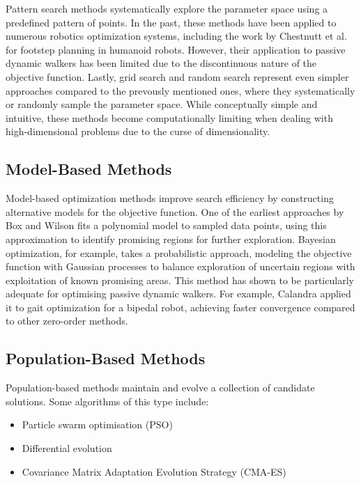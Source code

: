 Pattern search methods\cite{Hooke1961}\cite{Torczon1997} systematically explore the parameter space using a predefined pattern of points.
In the past, these methods have been applied to numerous robotics optimization systems, including the work by Chestnutt et al.\cite{Chestnutt2005} for footstep planning in humanoid robots. 
However, their application to passive dynamic walkers has been limited due to the discontinuous nature of the objective function.
Lastly, grid search and random search represent even simpler approaches compared to the prevously mentioned ones, where they systematically or randomly sample the parameter space.
While conceptually simple and intuitive, these methods become computationally limiting when dealing with high-dimensional problems due to the curse of dimensionality.

\subsection{Model-Based Methods}
Model-based optimization methods improve search efficiency by constructing alternative models for the objective function.
One of the earliest approaches by Box and Wilson\cite{Box1951} fits a polynomial model to sampled data points, using this approximation to identify promising regions for further exploration.
Bayesian optimization, for example, takes a probabilistic approach, modeling the objective function with Gaussian processes to balance exploration of uncertain regions with exploitation of known promising areas.
This method has shown to be particularly adequate for optimising passive dynamic walkers.
For example, Calandra\cite{Calandra2016} applied it to gait optimization for a bipedal robot, achieving faster convergence compared to other zero-order methods.

\subsection{Population-Based Methods}
Population-based methods maintain and evolve a collection of candidate solutions.
Some algorithms of this type include:

\begin{itemize}
    \item Particle swarm optimisation (PSO)\cite{Kennedy1995}
    \item Differential evolution\cite{Storn1997}
    \item Covariance Matrix Adaptation Evolution Strategy (CMA-ES)\cite{Hansen2001}
\end{itemize}

